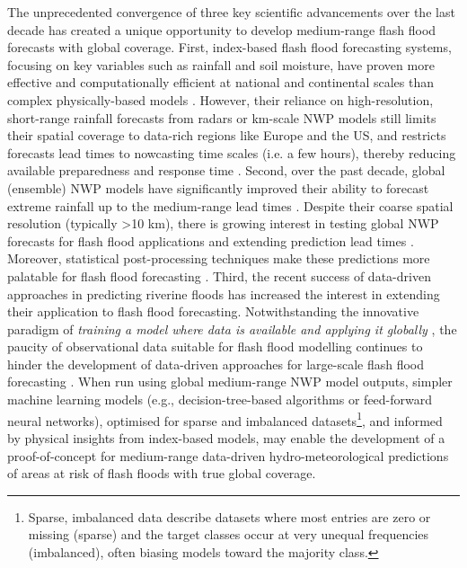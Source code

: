 \vspace{1em}
The  unprecedented convergence of three key scientific advancements over the last decade has created a unique opportunity to develop medium-range flash flood forecasts with global coverage. First, index-based flash flood forecasting systems, focusing on key variables such as rainfall and soil moisture, have proven more effective and computationally efficient at national and continental scales than complex physically-based models \citep{Alfieri_2015a}. However, their reliance on high-resolution, short-range rainfall forecasts from radars or km-scale NWP models still limits their spatial coverage to data-rich regions like Europe and the US, and restricts forecasts lead times to nowcasting time scales (i.e. a few hours), thereby reducing available preparedness and response time \citep{Luong_2021, Maybee_2024}. Second, over the past decade, global (ensemble) NWP models have significantly improved their ability to forecast extreme rainfall up to the medium-range lead times \citep{Lavers_2021, Haiden_2023}. Despite their coarse spatial resolution (typically >10 km), there is growing interest in testing global NWP forecasts for flash flood applications and extending prediction lead times \citep{Bucherie_2022b}. Moreover, statistical post-processing techniques make these predictions more palatable for flash flood forecasting \citep{Vannitsem_2021}. Third, the recent success of data-driven approaches in predicting riverine floods \citep{Nearing_2024} has increased the interest in extending their application to flash flood forecasting. Notwithstanding the innovative paradigm of \textit{training a model where data is available and applying it globally} \citep{Kratzert_2024}, the paucity of observational data suitable for flash flood modelling continues to hinder the development of data-driven approaches for large-scale flash flood forecasting \citep{Alzubaidi_2023}. When run using global medium-range NWP model outputs, simpler machine learning models (e.g., decision-tree-based algorithms or feed-forward neural networks), optimised for sparse and imbalanced datasets\footnote{Sparse, imbalanced data describe datasets where most entries are zero or missing (sparse) and the target classes occur at very unequal frequencies (imbalanced), often biasing models toward the majority class.}, and informed by physical insights from index-based models, may enable the development of a proof-of-concept for medium-range data-driven hydro-meteorological predictions of areas at risk of flash floods with true global coverage.


